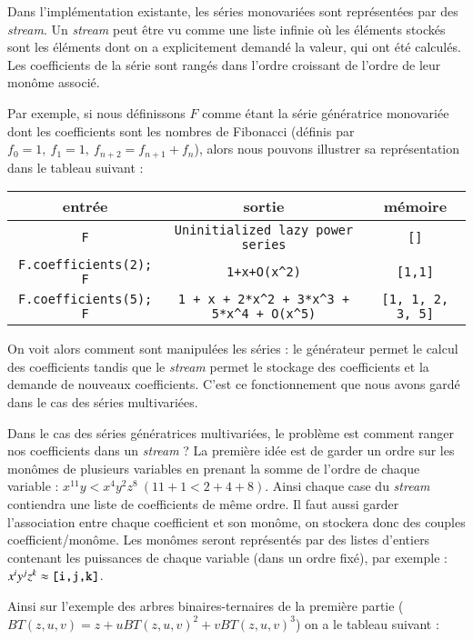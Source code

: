 \documentclass[12pt]{report}
\begin{document}
Dans l'implémentation existante, les séries monovariées sont représentées par
des \emph{stream}. Un \emph{stream} peut être vu comme une liste infinie où
les éléments stockés sont les éléments dont on a explicitement demandé la
valeur, qui ont été calculés. Les coefficients de la série sont rangés
dans l'ordre croissant de l'ordre de leur monôme associé. 


Par exemple, si nous définissons $F$ comme étant la série génératrice
monovariée dont les coefficients sont les nombres de Fibonacci (définis par
$f_0=1,\ f_1=1,\ f_{n+2} = f_{n+1} + f_n$), alors nous pouvons illustrer sa
représentation dans le tableau suivant :

\begin{center}
\begin{tabular}{|c|c|c|}
\hline
entrée & sortie  &  mémoire \\
\hline
\verb|F| & \verb|Uninitialized lazy power series| & \verb|[]| \\
\verb|F.coefficients(2); F| & \verb|1+x+O(x^2)| & \verb|[1,1]| \\
\verb|F.coefficients(5); F| & \verb|1 + x + 2*x^2 + 3*x^3 + 5*x^4 + O(x^5)| &
\verb|[1, 1, 2, 3, 5]| \\
\hline
\end{tabular}
\end{center}

On voit alors comment sont manipulées les séries : le générateur permet le
calcul des coefficients tandis que le \emph{stream} permet le stockage des
coefficients et la demande de nouveaux coefficients. C'est ce fonctionnement
que nous avons gardé dans le cas des séries multivariées.

\vspace{3mm}

Dans le cas des séries génératrices multivariées, le problème est comment
ranger nos coefficients dans un \emph{stream} ? La première idée est de garder
un ordre sur les monômes de plusieurs variables en prenant la somme de l'ordre
de chaque variable : $x^{11} y <x^4 y^2 z^8  \ (11+1 < 2+4+8)$. Ainsi chaque
case du \emph{stream} contiendra une liste de coefficients de même ordre. Il faut
aussi garder l'association entre chaque coefficient et son monôme, on stockera
donc des couples coefficient/monôme. Les monômes seront représentés par
des listes d'entiers contenant les puissances de chaque variable (dans un ordre
fixé), par exemple : $x^iy^jz^k \approx \verb|[i,j,k]|$.


Ainsi sur l'exemple des arbres binaires-ternaires de la première partie
($BT(z,u,v) = z+uBT(z,u,v)^2+vBT(z,u,v)^3$)
on a le tableau suivant :
\end{document}
